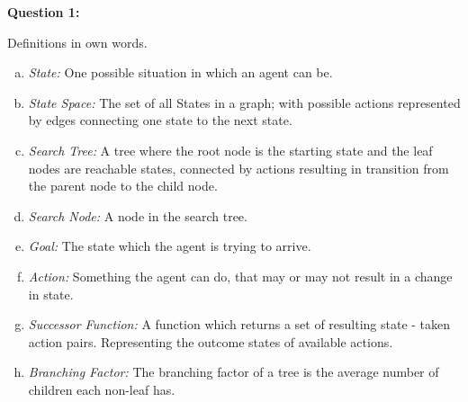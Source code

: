 \noindent\textbf{Question 1:}

Definitions in own words.
\noindent\begin{enumerate}[a)]
\item \emph{State:} One possible situation in which an agent can be.
\item \emph{State Space:} The set of all States in a graph; with possible actions represented by edges connecting one state to the next state.
\item \emph{Search Tree:} A tree where the root node is the starting state and the leaf nodes are reachable states, connected by actions resulting in transition from the parent node to the child node.
\item \emph{Search Node:} A node in the search tree.
\item \emph{Goal:} The state which the agent is trying to arrive. 
\item \emph{Action:} Something the agent can do, that may or may not result in a change in state.
\item \emph{Successor Function:} A function which returns a set of resulting state - taken action pairs. Representing the outcome states of available actions.
\item \emph{Branching Factor:} The branching factor of a tree is the average number of children each non-leaf has.
\end{enumerate}

